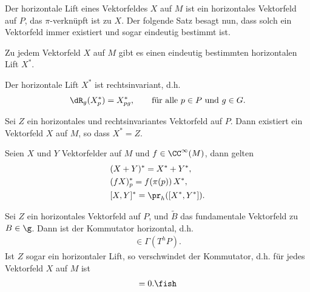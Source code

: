 \documentclass[%
	paper=a5,%
	fleqn,%
	DIV=18,%
	BCOR=0mm,
	fontsize=11pt,
	titlepage=false,%
	bibliography=totoc,
	DIV=18,%
	twoside=true,
	pdftitle=Riemannsche Geometrie,
	pdfauthor=Uwe Semmelmann,
	numbers=noendperiod]%
	{scrbook}
\begin{document}
Der horizontale Lift eines Vektorfeldes $X$ auf $M$ ist ein horizontales
Vektorfeld auf $P$, das $\pi$-verknüpft ist zu $X$. Der folgende Satz besagt nun,
dass solch ein Vektorfeld immer existiert und sogar eindeutig bestimmt ist.

\begin{prop}
\begin{propenum}
\item Zu jedem Vektorfeld $X$ auf $M$ gibt es einen eindeutig bestimmten
horizontalen Lift $X^*$.
\item Der horizontale Lift $X^*$ ist rechtsinvariant, d.h.
\begin{align*}
\dR_g(X_p^*) = X_{pg}^*,\qquad \text{für alle }p\in P\text{ und } g\in G.
\end{align*}
\item Sei $Z$ ein horizontales und rechtsinvariantes Vektorfeld auf  $P$. Dann
existiert ein Vektorfeld $X$ auf $M$, so dass $X^* = Z$.
\item Seien $X$ und $Y$ Vektorfelder auf $M$ und $f\in\CC^\infty(M)$, dann gelten
\begin{align*}
&(X+Y)^* = X^* + Y^*,\\
&(fX)^*_p = f(\pi(p)) \,  X^*,\\
&[X,Y]^* = \pr_h([X^*,Y^*]).
\end{align*}
\item Sei $Z$ ein horizontales Vektorfeld auf $P$, und $\tilde{B}$ das
fundamentale Vektorfeld zu $B\in\g$. Dann ist der Kommutator horizontal, d.h.
\begin{align*}
[Z,\tilde{B}] \in \Gamma(T^hP).
\end{align*}
Ist $Z$ sogar ein horizontaler Lift, so verschwindet der Kommutator, d.h. für
jedes Vektorfeld $X$ auf $M$ ist
\begin{align*}
[X^*,\tilde{B}] = 0.\fish
\end{align*} 
\end{propenum}
\end{prop}
\end{document}

